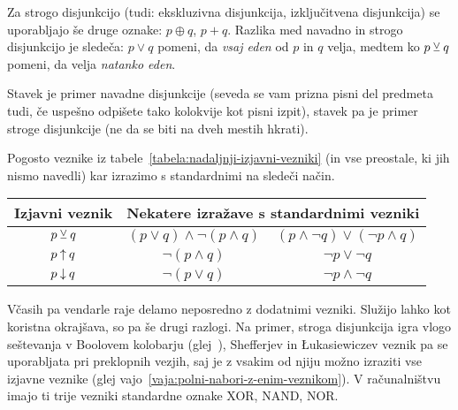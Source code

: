                 Za strogo disjunkcijo (tudi: ekskluzivna disjunkcija, izključitvena disjunkcija) se uporabljajo še druge oznake: $p \oplus q$, $p + q$. Razlika med navadno in strogo disjunkcijo je sledeča: $p \lor q$ pomeni, da \emph{vsaj eden} od $p$ in $q$ velja, medtem ko $p \mathbin{\veebar} q$ pomeni, da velja \emph{natanko eden}.

                \begin{zgled}
                        Stavek  je primer navadne disjunkcije (seveda se vam prizna pisni del predmeta tudi, če uspešno odpišete tako kolokvije kot pisni izpit), stavek  pa je primer stroge disjunkcije (ne da se biti na dveh mestih hkrati).
                \end{zgled}

                Pogosto veznike iz tabele~\ref{tabela:nadaljnji-izjavni-vezniki} (in vse preostale, ki jih nismo navedli) kar izrazimo s standardnimi na sledeči način.
                \begin{center}
                        \begin{tabular}{|ccc|}
                                \hline
                                \textbf{Izjavni veznik} & \multicolumn{2}{c|}{\textbf{Nekatere izražave s standardnimi vezniki}} \\
                                \hline
                                $p \mathbin{\veebar} q$ & $(p \lor q) \land \lnot(p \land q)$ & $(p \land \lnot{q}) \lor (\lnot{p} \land q)$ \\
                                $p \mathbin{\uparrow} q$ & $\lnot(p \land q)$ & $\lnot{p} \lor \lnot{q}$ \\
                                $p \mathbin{\downarrow} q$ & $\lnot(p \lor q)$ & $\lnot{p} \land \lnot{q}$ \\
                                \hline
                        \end{tabular}
                \end{center}

                Včasih pa vendarle raje delamo neposredno z dodatnimi vezniki. Služijo lahko kot koristna okrajšava, so pa še drugi razlogi. Na primer, stroga disjunkcija igra vlogo seštevanja v Boolovem kolobarju (glej~), Shefferjev in Łukasiewiczev veznik pa se uporabljata pri preklopnih vezjih, saj je z vsakim od njiju možno izraziti vse izjavne veznike (glej vajo~\ref{vaja:polni-nabori-z-enim-veznikom}). V računalništvu imajo ti trije vezniki standardne oznake XOR, NAND, NOR.

